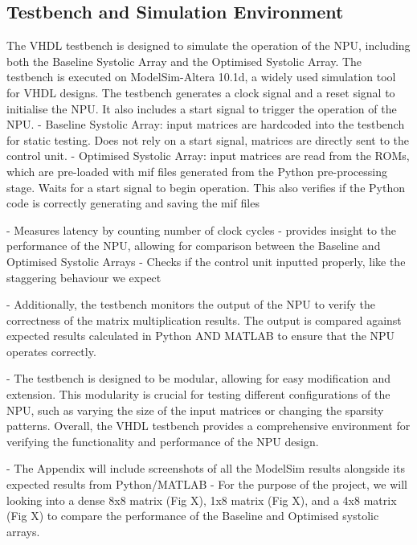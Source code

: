 \documentclass[12pt, a4paper, ukenglish]{article}
\begin{document}
    \subsection{Testbench and Simulation Environment} \label{sec: testbench}
    The VHDL testbench is designed to simulate the operation of the NPU, including both the Baseline Systolic Array and the Optimised Systolic Array. The testbench is executed on ModelSim-Altera 10.1d, a widely used simulation tool for VHDL designs. 
    The testbench generates a clock signal and a reset signal to initialise the NPU. It also includes a start signal to trigger the operation of the NPU. 
    - Baseline Systolic Array: input matrices are hardcoded into the testbench for static testing. Does not rely on a start signal, matrices are directly sent to the control unit.
    - Optimised Systolic Array: input matrices are read from the ROMs, which are pre-loaded with mif files generated from the Python pre-processing stage. Waits for a start signal to begin operation. This also verifies if the Python code is correctly generating and saving the mif files

    - Measures latency  by counting number of clock cycles 
    - provides insight to the performance of the NPU, allowing for comparison between the Baseline and Optimised Systolic Arrays
    - Checks if the control unit inputted properly, like the staggering behaviour we expect

    - Additionally, the testbench monitors the output of the NPU to verify the correctness of the matrix multiplication results. The output is compared against expected results calculated in Python AND MATLAB to ensure that the NPU operates correctly.

    - The testbench is designed to be modular, allowing for easy modification and extension. This modularity is crucial for testing different configurations of the NPU, such as varying the size of the input matrices or changing the sparsity patterns. Overall, the VHDL testbench provides a comprehensive environment for verifying the functionality and performance of the NPU design.  

    - The Appendix will include screenshots of all the ModelSim results alongside its expected results from Python/MATLAB 
    - For the purpose of the project, we will looking into a dense 8x8 matrix (Fig X), 1x8 matrix (Fig X), and a 4x8 matrix (Fig X) to compare the performance of the Baseline and Optimised systolic arrays. 
\end{document}
